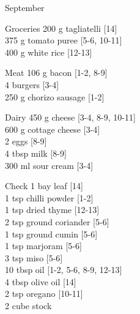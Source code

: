 \begin{menu}{September}
\begin{shoppinglist}{Groceries}
      200 g tagliatelli 
        {\scriptsize[14]}\\
      375 g tomato puree 
        {\scriptsize[5-6, 10-11]}\\
      400 g white rice 
        {\scriptsize[12-13]}\\
      \end{shoppinglist}%
      \par\vfil %
      \begin{shoppinglist}{Meat}
      106 g bacon 
        {\scriptsize[1-2, 8-9]}\\
      4  burgers 
        {\scriptsize[3-4]}\\
      250 g chorizo sausage 
        {\scriptsize[1-2]}\\
      \end{shoppinglist}%
      \begin{shoppinglist}{Dairy}
      450 g cheese 
        {\scriptsize[3-4, 8-9, 10-11]}\\
      600 g cottage cheese 
        {\scriptsize[3-4]}\\
      2  eggs 
        {\scriptsize[8-9]}\\
      4 tbsp milk 
        {\scriptsize[8-9]}\\
      300 ml sour cream 
        {\scriptsize[3-4]}\\
      \end{shoppinglist}%
      \par\vfil %
      \vfil\clearpage %
      \begin{shoppinglist}{Check}
      1  bay leaf 
        {\scriptsize[14]}\\
      1 tsp chilli powder 
        {\scriptsize[1-2]}\\
      1 tsp dried thyme 
        {\scriptsize[12-13]}\\
      2 tsp ground coriander 
        {\scriptsize[5-6]}\\
      1 tsp ground cumin 
        {\scriptsize[5-6]}\\
      1 tsp marjoram 
        {\scriptsize[5-6]}\\
      3 tsp miso 
        {\scriptsize[5-6]}\\
      10 tbsp oil 
        {\scriptsize[1-2, 5-6, 8-9, 12-13]}\\
      4 tbsp olive oil 
        {\scriptsize[14]}\\
      2 tsp oregano 
        {\scriptsize[10-11]}\\
      2 cube stock 

\end{shoppinglist}
\end{menu}
